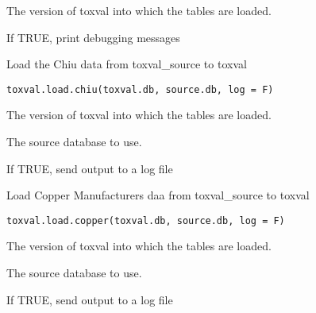 \documentclass[letterpaper]{book}
\begin{document}
%
\begin{Arguments}
\begin{ldescription}
\item[\code{toxval.db}] The version of toxval into which the tables are loaded.

\item[\code{verbose}] If TRUE, print debugging messages
\end{ldescription}
\end{Arguments}
%
\begin{Description}\relax
Load the Chiu data from toxval\_source to toxval
\end{Description}
%
\begin{Usage}
\begin{verbatim}
toxval.load.chiu(toxval.db, source.db, log = F)
\end{verbatim}
\end{Usage}
%
\begin{Arguments}
\begin{ldescription}
\item[\code{toxval.db}] The version of toxval into which the tables are loaded.

\item[\code{source.db}] The source database to use.

\item[\code{log}] If TRUE, send output to a log file
\end{ldescription}
\end{Arguments}
%
\begin{Description}\relax
Load Copper Manufacturers daa from toxval\_source to toxval
\end{Description}
%
\begin{Usage}
\begin{verbatim}
toxval.load.copper(toxval.db, source.db, log = F)
\end{verbatim}
\end{Usage}
%
\begin{Arguments}
\begin{ldescription}
\item[\code{toxval.db}] The version of toxval into which the tables are loaded.

\item[\code{source.db}] The source database to use.

\item[\code{log}] If TRUE, send output to a log file
\end{ldescription}
\end{Arguments}
\end{document}
